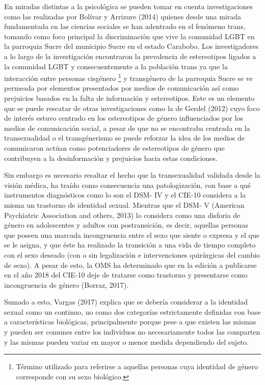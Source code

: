 En miradas distintas a la psicológica se pueden tomar en cuenta investigaciones
como las realizadas por Bolívar y Arrizure (2014) quienes desde una mirada
fundamentada en las ciencias sociales se han adentrado en el fenómeno trans,
tomando como foco principal la discriminación que vive la comunidad LGBT en la
parroquia Sucre del municipio Sucre en el estado Carabobo.
Los investigadores a lo largo de la investigación encontraron la prevalencia de
estereotipos ligados a la comunidad LGBT y consecuentemente a la población trans
ya que la interacción entre personas cisgénero
\footnote{Término utilizado para referirse a aquellas personas cuya identidad
de género corresponde con su sexo biológico.}
y transgénero de la parroquia
Sucre se ve permeada por elementos presentados por medios de comunicación así
como prejuicios basados en la falta de información y estereotipos.
Este es un elemento que se puede rescatar de otras investigaciones como la de
Gerdel (2012) cuyo foco de interés estuvo centrado en los estereotipos de género
influenciados por los medios de comunicación social, a pesar de que no se
encontraba centrada en la transexualidad o el transgénerismo se puede reforzar
la idea de los medios de comunicaron actúan como potenciadores de estereotipos
de género que contribuyen a la desinformación y prejuicios hacia estas
condiciones.

Sin embargo es necesario resaltar el hecho que la transexualidad validada desde
la visión médica, ha traído como consecuencia una patologización, con base a qué
instrumentos diagnósticos como lo son el DSM- IV y el CIE-10 considera a la
misma un trastorno de identidad sexual.
Mientras que el DSM- V (American Psychiatric Association and others, 2013) lo
considera como una disforia de género en adolescentes y adultos con
postransición, es decir, aquellas personas que poseen una marcada
incongruencia entre el sexo que siente o expresa y el que se le asigna, y que
éste ha realizado la transición a una vida de tiempo completo con el sexo
deseado (con o sin legalización e intervenciones quirúrgicas del cambio de
sexo).
A pesar de esto, la OMS ha determinado que en la edición a publicarse en el año
2018 del CIE-10 deje de tratarse como trastorno y presentarse como incongruencia
de género (Borraz, 2017).

Sumado a esto, Vargas (2017) explica que se debería considerar a la identidad
sexual como un continuo, no como dos categorías estrictamente definidas con base
a características biológicas, principalmente porque pese a que existen las
mismas y pueden ser comunes entre los individuos no necesariamente todos las
comparten y las mismas pueden variar en mayor o menor medida dependiendo del
sujeto.

